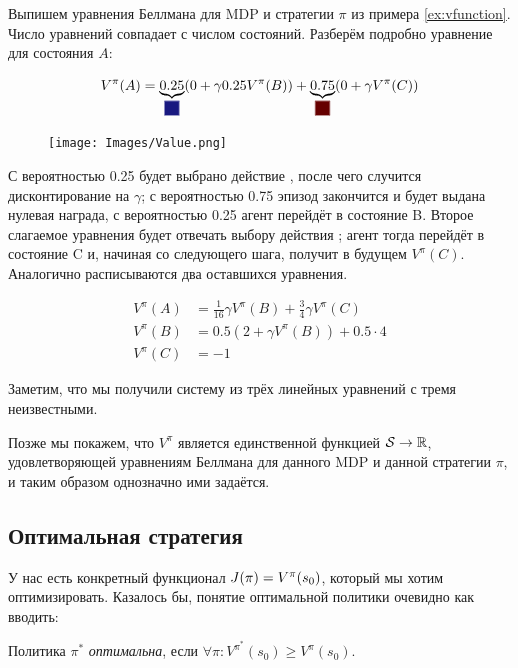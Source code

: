 \begin{example}
Выпишем уравнения Беллмана для MDP и стратегии $\pi$ из примера \ref{ex:vfunction}. Число уравнений совпадает с числом состояний. Разберём подробно уравнение для состояния $A$:

$$
V^{\pi}(A) = \underbrace{0.25}_{\colorsquare{ChadBlue}} (0 + \gamma 0.25 V^{\pi}(B)) + \underbrace{0.75}_{\colorsquare{ChadRed}} (0 + \gamma V^{\pi}(C) )
$$

\begin{figure}
\vspace{-0.8cm}
\centering
\texttt{[image: Images/Value.png]}
\vspace{-1cm}
\end{figure}

С вероятностью 0.25 будет выбрано действие , после чего случится дисконтирование на $\gamma$; с вероятностью 0.75 эпизод закончится и будет выдана нулевая награда, с вероятностью 0.25 агент перейдёт в состояние B. Второе слагаемое уравнения будет отвечать выбору действия ; агент тогда перейдёт в состояние C и, начиная со следующего шага, получит в будущем $V^{\pi}(C)$. Аналогично расписываются два оставшихся уравнения.

\vspace{-0.4cm}
\begin{align*}
V^{\pi}(A) &= \frac{1}{16} \gamma V^{\pi}(B) + \frac{3}{4} \gamma V^{\pi}(C) \\
V^{\pi}(B) &= 0.5 \left(2 + \gamma V^{\pi}(B) \right) + 0.5 \cdot 4 \\
V^{\pi}(C) &= -1
\end{align*}

Заметим, что мы получили систему из трёх линейных уравнений с тремя неизвестными.
\end{example}

Позже мы покажем, что $V^\pi$ является единственной функцией $\St \HM\to \R$, удовлетворяющей уравнениям Беллмана для данного MDP и данной стратегии $\pi$, и таким образом однозначно ими задаётся.

\subsection{Оптимальная стратегия}

У нас есть конкретный функционал $J(\pi) \HM= V^{\pi}(s_0)$, который мы хотим оптимизировать. Казалось бы, понятие оптимальной политики очевидно как вводить:
\begin{definition} 
Политика $\pi^*$ \emph{оптимальна}, если $\forall \pi \colon V^{\pi^*}(s_0) \ge V^\pi(s_0)$.
\end{definition}

